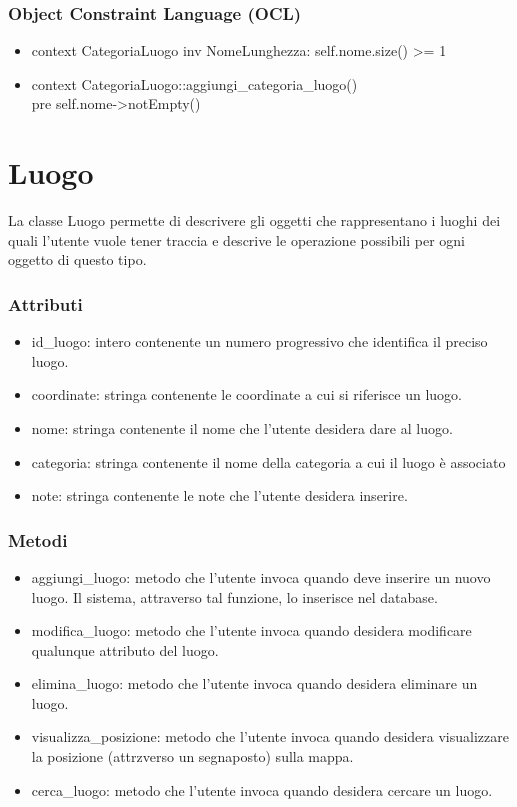 \documentclass[a4paper,12pt]{article}
\begin{document}
\subsubsection*{Object Constraint Language (OCL)}
\begin{itemize} \setlength\itemsep{0.01em}
\item {\ttfamily context CategoriaLuogo inv NomeLunghezza: self.nome.size() >= 1}
\item {\ttfamily context CategoriaLuogo::aggiungi\_categoria\_luogo() \\pre self.nome->notEmpty()}
\end{itemize}

\section{Luogo}
La classe {\sffamily Luogo} permette di descrivere gli oggetti che rappresentano i luoghi dei quali l'utente vuole tener traccia e descrive le operazione possibili per ogni oggetto di questo tipo. 
\subsubsection*{Attributi}
\begin{itemize} \setlength\itemsep{0.01em}
\item {\ttfamily id\_luogo}: intero contenente un numero progressivo che identifica il preciso luogo.
\item {\ttfamily coordinate}: stringa contenente le coordinate a cui si riferisce un luogo.
\item {\ttfamily nome}: stringa contenente il nome che l'utente desidera dare al luogo.
\item {\ttfamily categoria}: stringa contenente il nome della categoria a cui il luogo è associato
\item {\ttfamily note}: stringa contenente le note che l'utente desidera inserire.
\end{itemize}
\subsubsection*{Metodi}
\begin{itemize} \setlength\itemsep{0.01em}
\item {\ttfamily aggiungi\_luogo}: metodo che l'utente invoca quando deve inserire un nuovo luogo. Il sistema, attraverso tal funzione, lo inserisce nel database.
\item {\ttfamily modifica\_luogo}: metodo che l'utente invoca quando desidera modificare qualunque attributo del luogo.
\item {\ttfamily elimina\_luogo}: metodo che l'utente invoca quando desidera eliminare un luogo. 
\item {\ttfamily visualizza\_posizione}: metodo che l'utente invoca quando desidera visualizzare la posizione (attrzverso un segnaposto) sulla mappa.
\item {\ttfamily cerca\_luogo}: metodo che l'utente invoca quando desidera cercare un luogo. 
\end{itemize}
\end{document}
